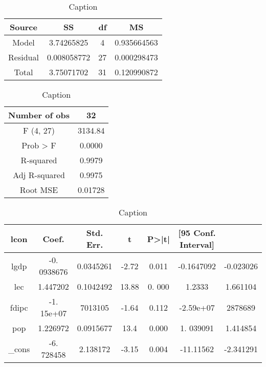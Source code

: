 \begin{table}
    \centering
    \begin{tabular}{|c|c|c|c|} \hline 
         Source&  SS&  df& MS
\\ \hline 
         Model&  3.74265825&  4& 0.935664563
\\ \hline 
         Residual&  0.008058772&  27& 0.000298473
\\ \hline 
         Total&  3.75071702&  31& 0.120990872\\ \hline
    \end{tabular}
    \caption{Caption}
    \label{tab:my_label}
\end{table}

\begin{table}
    \centering
    \begin{tabular}{|c|c|} \hline 
         Number of obs& 32
\\ \hline 
         F (4, 27)& 3134.84
\\ \hline 
         Prob > F& 0.0000
\\ \hline 
         R-squared& 0.9979
\\ \hline 
         Adj R-squared& 0.9975
\\ \hline 
         Root MSE& 0.01728\\ \hline
    \end{tabular}
    \caption{Caption}
    \label{tab:my_label}
\end{table}

\begin{table}
    \centering
    \begin{tabular}{|c|c|c|c|c|c|c|} \hline 
         lcon&  Coef.&  Std. Err.&  t&  P>|t|&  [95 Conf. Interval]& 
\\ \hline 
         lgdp&  -0. 0938676&  0.0345261&  -2.72&  0.011&  -0﻿.1647092& -0.023026
\\ \hline 
         lec&  1.447202&  0.1042492&  13.88&  0. 000&  1.2333& 1.661104
\\ \hline 
         fdipc&  -1. 15e+07&  7013105&  -1.64&  0.112&  ﻿-2.59e+07& 2878689
\\ \hline 
         pop&  1.226972&  0.0915677&  13.4&  0.000&  1. 039091& 1.414854
\\ \hline 
         _cons&  -6. 728458&  2.138172&  -3.15&  0.004&  -11.11562& -2.341291\\ \hline
    \end{tabular}
    \caption{Caption}
    \label{tab:my_label}
\end{table}

